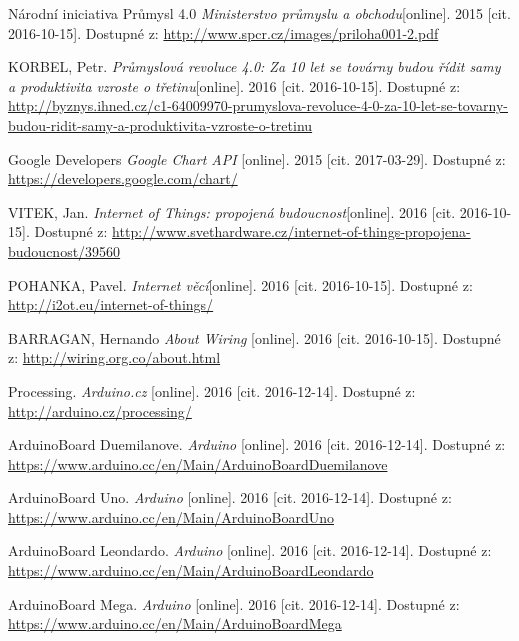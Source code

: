 \begin{literatura}{99}


 Národní iniciativa Průmysl 4.0 \textit{Ministerstvo průmyslu a obchodu}[online]. 2015 [cit. 2016-10-15]. Dostupné z: \url{http://www.spcr.cz/images/priloha001-2.pdf}

 KORBEL, Petr. \textit{Průmyslová revoluce 4.0: Za 10 let se továrny budou řídit samy a produktivita vzroste o třetinu}[online]. 2016 [cit. 2016-10-15]. Dostupné z: \url{http://byznys.ihned.cz/c1-64009970-prumyslova-revoluce-4-0-za-10-let-se-tovarny-budou-ridit-samy-a-produktivita-vzroste-o-tretinu}

 Google Developers \textit{Google Chart API} [online]. 2015 [cit. 2017-03-29]. Dostupné z: \url{https://developers.google.com/chart/}


 VITEK, Jan. \textit{Internet of Things: propojená budoucnost}[online]. 2016 [cit. 2016-10-15]. Dostupné z: \url{http://www.svethardware.cz/internet-of-things-propojena-budoucnost/39560}

 POHANKA, Pavel. \textit{Internet věcí}[online]. 2016 [cit. 2016-10-15]. Dostupné z: \url{http://i2ot.eu/internet-of-things/}


 BARRAGAN, Hernando \textit{About Wiring} [online]. 2016 [cit. 2016-10-15]. Dostupné z: \url{http://wiring.org.co/about.html}

 Processing. \textit{Arduino.cz} [online]. 2016 [cit. 2016-12-14]. Dostupné z: \url{http://arduino.cz/processing/}

 ArduinoBoard Duemilanove. \textit{Arduino} [online]. 2016 [cit. 2016-12-14]. Dostupné z: \url{https://www.arduino.cc/en/Main/ArduinoBoardDuemilanove}

 ArduinoBoard Uno. \textit{Arduino} [online]. 2016 [cit. 2016-12-14]. Dostupné z: \url{https://www.arduino.cc/en/Main/ArduinoBoardUno}

 ArduinoBoard Leondardo. \textit{Arduino} [online]. 2016 [cit. 2016-12-14].  Dostupné z: \url{https://www.arduino.cc/en/Main/ArduinoBoardLeondardo}

 ArduinoBoard Mega. \textit{Arduino} [online]. 2016 [cit. 2016-12-14]. Dostupné z: \url{https://www.arduino.cc/en/Main/ArduinoBoardMega}


\end{literatura}
